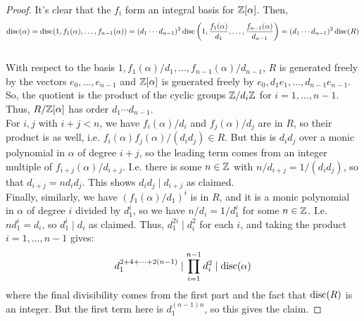 \begin{proof} 
    It's clear that the $f_i$ form an integral basis for $\mathbb{Z}[\alpha]$. Then,
    \[ \operatorname{disc}(\alpha) = \operatorname{disc}(1,f_1(\alpha),\ldots,f_{n-1}(\alpha)) = (d_1 \cdots d_{n-1})^2\operatorname{disc}\left(1,\frac{f_1(\alpha)}{d_1},\ldots,\frac{f_{n-1}(\alpha)}{d_{n-1}}\right) = (d_1 \cdots d_{n-1})^2\operatorname{disc}(R) \] \\
    
    With respect to the basis $1,f_1(\alpha)/d_1,\ldots,f_{n-1}(\alpha)/d_{n-1}$, $R$ is generated freely by the vectors $e_0,\ldots,e_{n-1}$ and $\mathbb{Z}[\alpha]$ is generated freely by $e_0,d_1e_1,\ldots,d_{n-1}e_{n-1}$. So, the quotient is the product of the cyclic groups $\mathbb{Z}/d_i\mathbb{Z}$ for $i=1,\ldots,n-1$. Thus, $R/\mathbb{Z}[\alpha]$ has order $d_1 \cdots d_{n-1}$. \\

    For $i,j$ with $i+j < n$, we have $f_i(\alpha)/d_i$ and $f_j(\alpha)/d_j$ are in $R$, so their product is as well, i.e. $f_i(\alpha)f_j(\alpha)/(d_id_j) \in R$. But this is $d_id_j$ over a monic polynomial in $\alpha$ of degree $i+j$, so the leading term comes from an integer multiple of $f_{i+j}(\alpha)/d_{i+j}$. I.e. there is some $n \in \mathbb{Z}$ with $n/d_{i+j} = 1/(d_id_j)$, so that $d_{i+j} = nd_id_j$. This shows $d_id_j \mid d_{i+j}$ as claimed. \\

    Finally, similarly, we have $(f_1(\alpha)/d_1)^i$ is in $R$, and it is a monic polynomial in $\alpha$ of degree $i$ divided by $d_1^i$, so we have $n/d_i = 1/d_1^i$ for some $n \in \mathbb{Z}$. I.e. $nd_1^i = d_i$, so $d_1^i \mid d_i$ as claimed. Thus, $d_1^{2i} \mid d_i^2$ for each $i$, and taking the product $i=1,\ldots,n-1$ gives:
    \[ d_1^{2+4+\cdots+2(n-1)} \mid \prod_{i=1}^{n-1} d_i^2 \mid \operatorname{disc}(\alpha) \]
    where the final divisibility comes from the first part and the fact that $\operatorname{disc}(R)$ is an integer. But the first term here is $d_1^{(n-1)n}$, so this gives the claim.
\end{proof}

